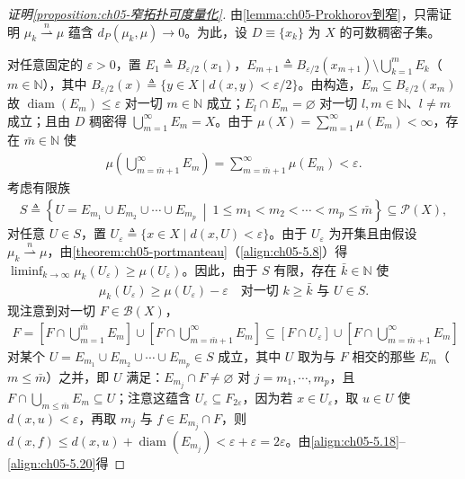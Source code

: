 \documentclass[../../main.tex]{subfiles}%
\begin{document}
\begin{proof}[证明\cref{proposition:ch05-窄拓扑可度量化}]
由\cref{lemma:ch05-Prokhorov到窄}，只需证明 $\mu_k\stackrel{n}{\rightharpoonup}\mu$ 蕴含 $d_P(\mu_k,\mu)\to0$。为此，设 $D\equiv\{x_k\}$ 为 $X$ 的可数稠密子集。

对任意固定的 $\varepsilon>0$，置 $E_1\triangleq B_{\varepsilon/2}(x_1)$，$E_{m+1}\triangleq B_{\varepsilon/2}(x_{m+1})\setminus\bigcup_{k=1}^m E_k$（$m\in\mathbb{N}$），其中 $B_{\varepsilon/2}(x)\triangleq \{y\in X\mid d(x,y)<\varepsilon/2\}$。由构造，$E_m\subseteq B_{\varepsilon/2}(x_m)$ 故 $\operatorname{diam}(E_m)\leqslant\varepsilon$ 对一切 $m\in\mathbb{N}$ 成立；$E_l\cap E_m=\varnothing$ 对一切 $l,m\in\mathbb{N}$、$l\neq m$ 成立；且由 $D$ 稠密得 $\bigcup_{m=1}^\infty E_m=X$。由于 $\mu(X)=\sum_{m=1}^\infty\mu(E_m)<\infty$，存在 $\bar{m}\in\mathbb{N}$ 使
\begin{align}
\mu\!\left(\bigcup_{m=\bar{m}+1}^\infty E_m\right)
=\sum_{m=\bar{m}+1}^\infty\mu(E_m)<\varepsilon.\label{align:ch05-5.18}
\end{align}
考虑有限族
\begin{align*}
S\triangleq \left\{U=E_{m_1}\cup E_{m_2}\cup\cdots\cup E_{m_p}\ \middle|\
1\leqslant m_1<m_2<\cdots<m_p\leqslant\bar{m}\right\}\subseteq\mathcal{P}(X),
\end{align*}
对任意 $U\in S$，置 $U_\varepsilon\triangleq \{x\in X\mid d(x,U)<\varepsilon\}$。由于 $U_\varepsilon$ 为开集且由假设 $\mu_k\stackrel{n}{\rightharpoonup}\mu$，由\cref{theorem:ch05-portmanteau}（\eqref{align:ch05-5.8}）得 $\liminf_{k\to\infty}\mu_k(U_\varepsilon)\geqslant\mu(U_\varepsilon)$。因此，由于 $S$ 有限，存在 $\bar{k}\in\mathbb{N}$ 使
\begin{align}
\mu_k(U_\varepsilon)\geqslant\mu(U_\varepsilon)-\varepsilon
\quad\text{对一切 }k\geqslant\bar{k}\text{ 与 }U\in S.\label{align:ch05-5.19}
\end{align}
现注意到对一切 $F\in\mathscr{B}(X)$，
\begin{align}
F=\left[F\cap\bigcup_{m=1}^{\bar{m}}E_m\right]
\cup\left[F\cap\bigcup_{m=\bar{m}+1}^\infty E_m\right]
\subseteq[F\cap U_\varepsilon]\cup\left[F\cap\bigcup_{m=\bar{m}+1}^\infty E_m\right]\label{align:ch05-5.20}
\end{align}
对某个 $U=E_{m_1}\cup E_{m_2}\cup\cdots\cup E_{m_p}\in S$ 成立，其中 $U$ 取为与 $F$ 相交的那些 $E_m$（$m\leqslant\bar{m}$）之并，即 $U$ 满足：$E_{m_j}\cap F\neq\varnothing$ 对 $j=m_1,\cdots ,m_p$，且 $F\cap\bigcup_{m\leqslant\bar{m}}E_m\subseteq U$；注意这蕴含 $U_\varepsilon\subseteq F_{2\varepsilon}$，因为若 $x\in U_\varepsilon$，取 $u\in U$ 使 $d(x,u)<\varepsilon$，再取 $m_j$ 与 $f\in E_{m_j}\cap F$，则 $d(x,f)\leqslant d(x,u)+\operatorname{diam}(E_{m_j})<\varepsilon+\varepsilon=2\varepsilon$。由\eqref{align:ch05-5.18}–\eqref{align:ch05-5.20}得

\end{proof}
\end{document}
